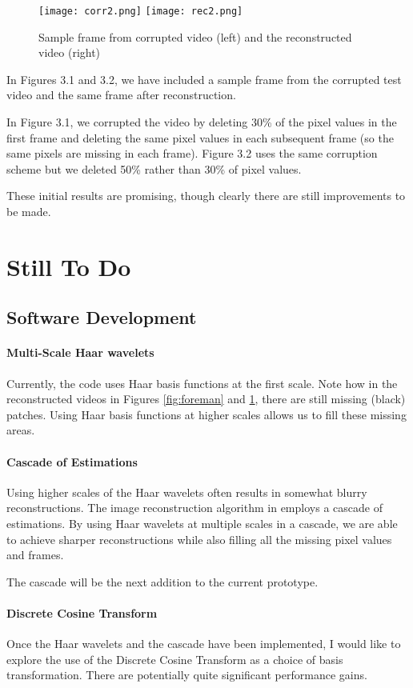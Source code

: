 \documentclass[final,3p]{report}
\begin{document}
\begin{figure}
\label{fig:soccer}
\center
\texttt{[image: corr2.png]}
\texttt{[image: rec2.png]}
\caption{Sample frame from corrupted video (left) and the reconstructed video (right)}
\end{figure}

In Figures 3.1 and 3.2, we have included a sample frame from the corrupted test video and the same frame after reconstruction.

In Figure 3.1, we corrupted the video by deleting 30\% of the pixel values in the first frame and deleting the same pixel values in each subsequent frame (so the same pixels are missing in each frame).
Figure 3.2 uses the same corruption scheme but we deleted 50\% rather than 30\% of pixel values.

These initial results are promising, though clearly there are still improvements to be made.

\chapter{Still To Do}

\section{Software Development}
\subsubsection{Multi-Scale Haar wavelets}
Currently, the code uses Haar basis functions at the first scale. 
Note how in the reconstructed videos in Figures \ref{fig:foreman} and \ref{fig:soccer}, there are still missing (black) patches.
Using Haar basis functions at higher scales allows us to fill these missing areas.

\subsubsection{Cascade of Estimations}
Using higher scales of the Haar wavelets often results in somewhat blurry reconstructions.
The image reconstruction algorithm in \cite{pilikos2014} employs a cascade of estimations.
By using Haar wavelets at multiple scales in a cascade, we are able to achieve sharper reconstructions while also filling all the missing pixel values and frames.

The cascade will be the next addition to the current prototype.

\subsubsection{Discrete Cosine Transform}
Once the Haar wavelets and the cascade have been implemented, I would like to explore the use of the Discrete Cosine Transform as a choice of basis transformation. 
There are potentially quite significant performance gains.
\end{document}

